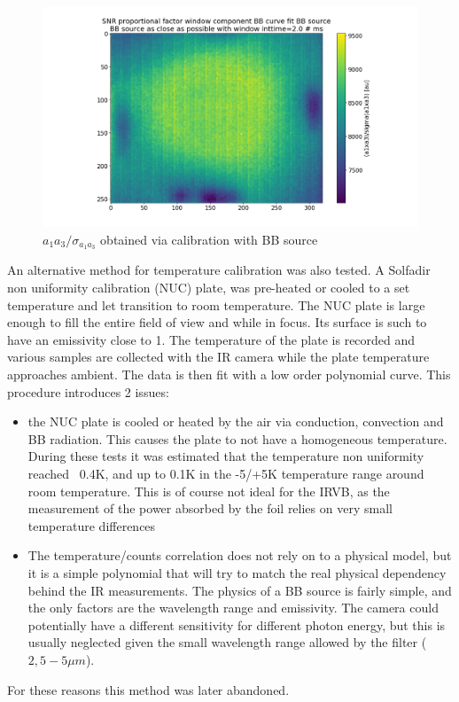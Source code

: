 \begin{figure}
	\centering
	\includegraphics[trim={140 0 120 0},clip,width=\linewidth]{Chapters/chapter2/figs/calib_a1a3SNR.png}
	\caption{$a_1 a_3 / \sigma_{a_1 a_3}$ obtained via calibration with BB source}
	\label{fig:BBcaliba1a3SNR}
\end{figure}

An alternative method for temperature calibration was also tested. A Solfadir non uniformity calibration (NUC) plate, was pre-heated or cooled to a set temperature and let transition to room temperature. The NUC plate is large enough to fill the entire field of view and while in focus. Its surface is such to have an emissivity close to 1. The temperature of the plate is recorded and various samples are collected with the IR camera while the plate temperature approaches ambient. The data is then fit with a low order polynomial curve. This procedure introduces 2 issues:
\begin{itemize}
    \item the NUC plate is cooled or heated by the air via conduction, convection and BB radiation. This causes the plate to not have a homogeneous temperature. During these tests it was estimated that the temperature non uniformity reached ~0.4K, and up to 0.1K in the -5/+5K temperature range around room temperature. This is of course not ideal for the IRVB, as the measurement of the power absorbed by the foil relies on very small temperature differences
    \item The temperature/counts correlation does not rely on to a physical model, but it is a simple polynomial that will try to match the real physical dependency behind the IR measurements. The physics of a BB source is fairly simple, and the only factors are the wavelength range and emissivity. The camera could potentially have a different sensitivity for different photon energy, but this is usually neglected given the small wavelength range allowed by the filter ($2,5-5\mu m$).
\end{itemize}
For these reasons this method was later abandoned.

